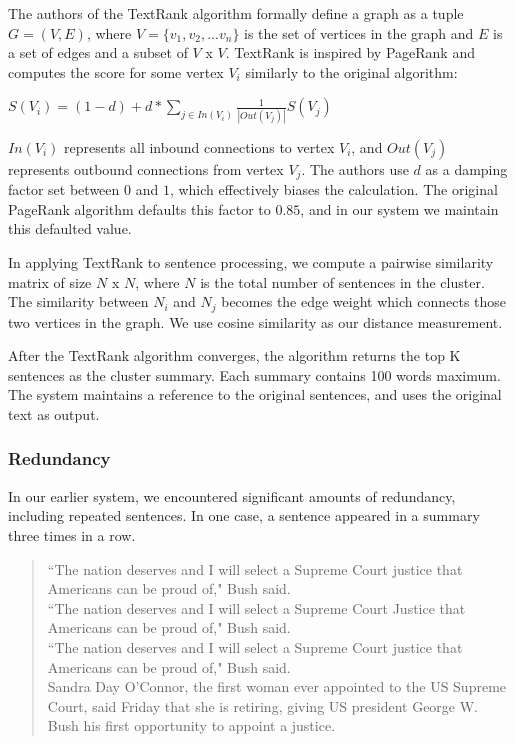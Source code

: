 \documentclass[11pt]{article}
\begin{document}
The authors of the TextRank algorithm formally define a graph as a tuple $G = (V,E)$, where $V = \{v_1, v_2, ... v_n\}$ is the set of vertices in the graph and $E$ is a set of edges and a subset of $V$ x $V$. TextRank is inspired by PageRank and computes the score for some vertex $V_i$ similarly to the original algorithm:
\begin{center}
    $S(V_i) = (1 - d) + d * \sum_{j \in In(V_i)} \frac{1}{|Out(V_j)|}S(V_j)$
\end{center}
$In(V_i)$ represents all inbound connections to vertex $V_i$, and $Out(V_j)$ represents outbound connections from vertex $V_j$. The authors use $d$ as a damping factor set between $0$ and $1$, which effectively biases the calculation. The original PageRank algorithm defaults this factor to $0.85$, and in our system we maintain this defaulted value.

In applying TextRank to sentence processing, we compute a pairwise similarity matrix of size $N$ x $N$, where $N$ is the total number of sentences in the cluster. The similarity between $N_i$ and $N_j$ becomes the edge weight which connects those two vertices in the graph. We use cosine similarity as our distance measurement.

After the TextRank algorithm converges, the algorithm returns the top K sentences as the cluster summary. Each summary contains 100 words maximum. The system maintains a 
reference to the original sentences, and uses the original text as output.

\subsubsection{Redundancy}
In our earlier system, we encountered significant amounts of redundancy, including repeated sentences. In one case, a sentence appeared in a summary three times in a row. 

\begin{quote}
``The nation deserves and I will select a Supreme Court justice that Americans can be proud of," Bush said.\\
``The nation deserves and I will select a Supreme Court Justice that Americans can be proud of," Bush said.\\
``The nation deserves and I will select a Supreme Court justice that Americans can be proud of," Bush said.\\
Sandra Day O'Connor, the first  woman ever appointed to the US Supreme Court, said Friday that she is retiring, giving US president George W. Bush his first  opportunity to appoint a justice.
\end{quote}
\end{document}
